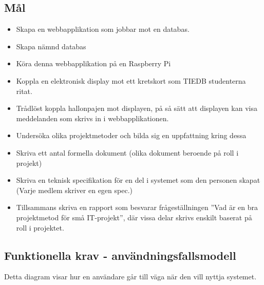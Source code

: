 \documentclass[11pt]{article}
\begin{document}
\subsection{Mål}
\label{sec:orga221e58}
\begin{itemize}
\item Skapa en webbapplikation som jobbar mot en databas.

\item Skapa nämnd databas

\item Köra denna webbapplikation på en Raspberry Pi

\item Koppla en elektronisk display mot ett kretskort som TIEDB studenterna
ritat.

\item Trådlöst koppla hallonpajen mot displayen, på så sätt att displayen
kan visa meddelanden som skrivs in i webbapplikationen.

\item Undersöka olika projektmetoder och bilda sig en uppfattning kring
dessa

\item Skriva ett antal formella dokument (olika dokument beroende på roll i
projekt)

\item Skriva en teknisk specifikation för en del i systemet som den
personen skapat (Varje medlem skriver en egen spec.)

\item Tillsammans skriva en rapport som besvarar frågeställningen ”Vad är
en bra projektmetod för små IT-projekt”, där vissa delar skrivs
enskilt baserat på roll i projektet.
\end{itemize}

\subsection{Funktionella krav - användningsfallsmodell}
\label{sec:org9e516c1}
Detta diagram visar hur en användare går till väga när den vill nyttja
systemet.
\end{document}
